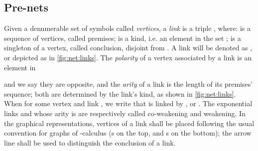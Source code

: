 \subsection{Pre-nets}
\label{sec:nets:prenets}

\begin{definition}[Links] \label{def:link}
Given a denumerable set of symbols called \textit{vertices}, a \textit{link} 
is a triple , where:
 is a sequence of vertices, called premises;
 is a kind, i.e. an element in the set
  ;
 is a singleton of a vertex, called conclusion, disjoint from .
A link  will be denoted 
as , or depicted as in 
\autoref{fig:net:links}.
The \textit{polarity} of a vertex associated by a link is an element in 

and we say they are opposite,
and the \textit{arity} of a link is the length of its premises' sequence;
both are determined by the link's kind,
as shown in \autoref{fig:net:links}.
When  for some vertex  and link , we write that 
 is linked by , or .
The exponential links  and  whose arity is  are 
respectively called co-weakening and weakening.
In the graphical representations, vertices of a link shall be placed following 
the usual convention for graphs of -calculus (s on the top, 
and s on the bottom); the arrow line shall be used to distinguish 
the conclusion of a link.
\end{definition}

